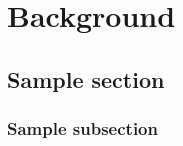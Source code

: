 \chapter{Background}
\label{chap:Background}

\section{Sample section}
\label{sec:SampleSection}
\subsection{Sample subsection}


